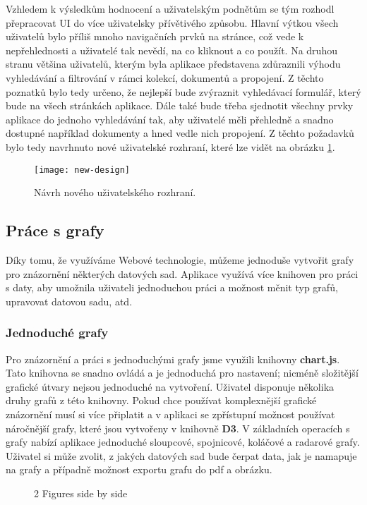 \par Vzhledem k výsledkům hodnocení a uživatelským podnětům se tým rozhodl přepracovat UI do více uživatelsky přívětivého způsobu. Hlavní výtkou všech uživatelů bylo příliš mnoho navigačních prvků na stránce, což vede k nepřehlednosti a uživatelé tak nevědí, na co kliknout a co použít. Na druhou stranu většina uživatelů, kterým byla aplikace představena zdůraznili výhodu vyhledávání a filtrování v rámci kolekcí, dokumentů a propojení. Z těchto poznatků bylo tedy určeno, že nejlepší bude zvýraznit vyhledávací formulář, který bude na všech stránkách aplikace. Dále také bude třeba sjednotit všechny prvky aplikace do jednoho vyhledávání tak, aby uživatelé měli přehledně a snadno dostupné například dokumenty a hned vedle nich propojení. Z těchto požadavků bylo tedy navrhnuto nové uživatelské rozhraní, které lze vidět na obrázku \ref{new-ui}.

\begin{figure}[htp]
\centering
\texttt{[image: new-design]}
\caption{Návrh nového uživatelského rozhraní.}
\label{new-ui}
\end{figure}

\subsection{Práce s grafy}
\par Díky tomu, že využíváme Webové technologie, můžeme jednoduše vytvořit grafy pro znázornění některých datových sad. Aplikace využívá více knihoven pro práci s daty, aby umožnila uživateli jednoduchou práci a možnost měnit typ grafů, upravovat datovou sadu, atd.

\subsubsection{Jednoduché grafy}
\par Pro znázornění a práci s jednoduchými grafy jsme využili knihovny \textbf{chart.js}. Tato knihovna se snadno ovládá a je jednoduchá pro nastavení; nicméně složitější grafické útvary nejsou jednoduché na vytvoření. Uživatel disponuje několika druhy grafů z této knihovny. Pokud chce používat komplexnější grafické znázornění musí si více připlatit a v aplikaci se zpřístupní možnost používat náročnější grafy, které jsou vytvořeny v knihovně \textbf{D3}. V základních operacích s grafy nabízí aplikace jednoduché sloupcové, spojnicové, koláčové a radarové grafy. Uživatel si může zvolit, z jakých datových sad bude čerpat data, jak je namapuje na grafy a případně možnost exportu grafu do pdf a obrázku.
\begin{figure}[!htb]
\centering
{}%
%
%
\caption{2 Figures side by side}%
\label{fig:example}%
\end{figure}

